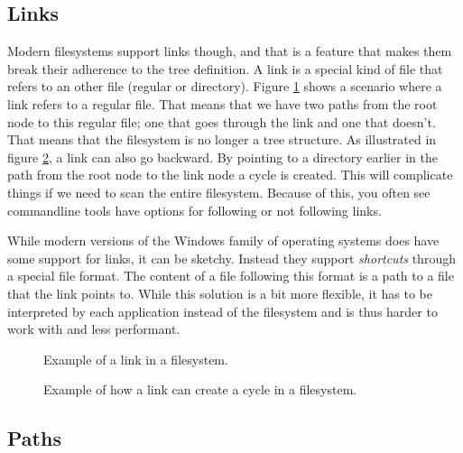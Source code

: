 \subsection{Links}

Modern filesystems support links though, and that is a feature that makes them break their adherence to the tree definition. A link is a special kind of file that refers to an other file (regular or directory). Figure \ref{fig:bs:fs:links} shows a scenario where a link refers to a regular file. That means that we have two paths from the root node to this regular file; one that goes through the link and one that doesn't. That means that the filesystem is no longer a tree structure. As illustrated in figure \ref{fig:bs:fs:cycles}, a link can also go backward. By pointing to a directory earlier in the path from the root node to the link node a cycle is created. This will complicate things if we need to scan the entire filesystem. Because of this, you often see commandline tools have options for following or not following links.

While modern versions of the Windows family of operating systems does have some support for links, it can be sketchy. Instead they support \textsl{shortcuts} through a special  file format. The content of a file following this format is a path to a file that the link points to. While this solution is a bit more flexible, it has to be interpreted by each application instead of the filesystem and is thus harder to work with and less performant.

\begin{figure}[tbp]
  
  \caption{Example of a link in a filesystem.}
  \label{fig:bs:fs:links}
\end{figure}

\begin{figure}[tbp]
  
  \caption{Example of how a link can create a cycle in a filesystem.}
  \label{fig:bs:fs:cycles}
\end{figure}

\subsection{Paths}

